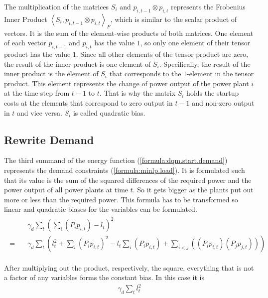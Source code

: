 The multiplication of the matrices $S_i$ and $p_{i, t-1} \otimes p_{i, t}$ represents the Frobenius Inner Product $\left\langle S_i, p_{i, t-1} \otimes p_{i, t} \right\rangle_F$, which is similar to the scalar product of vectors.
It is the sum of the element-wise products of both matrices.
One element of each vector $p_{i, t-1}$ and $p_{i, t}$ has the value $1$, so only one element of their tensor product has the value $1$.
Since all other elements of the tensor product are zero, the result of the inner product is one element of $S_i$.
Specifically, the result of the inner product is the element of $S_i$ that corresponds to the $1$-element in the tensor product.
This element represents the change of power output of the power plant $i$ at the time step from $t-1$ to $t$.
That is why the matrix $S_i$ holds the startup costs at the elements that correspond to zero output in $t-1$ and non-zero output in $t$ and vice versa.
$S_i$ is called quadratic bias.

\subsection{Rewrite Demand}

The third summand of the energy function (\ref{formula:dqm.start.demand}) represents the demand constraints (\ref{formula:minlp.load}).
It is formulated such that its value is the sum of the squared differences of the required power and the power output of all power plants at time $t$.
So it gets bigger as the plants put out more or less than the required power.
This formula has to be transformed so linear and quadratic biases for the variables can be formulated.
\begin{align}
\begin{split}
  & \gamma_d \sum_t \left( \sum_i \left( P_i p_{i, t} \right) - l_t \right)^2 \\
  = \quad & \gamma_d \sum_t \left(
    l_t^2
    + \sum_i \left( P_i p_{i, t} \right)^2
    - l_t \sum_i \left( P_i p_{i, t} \right)
    + \sum_{i < j} \left( \left( P_i p_{i, t} \right) \left( P_j p_{j, t} \right) \right) \right)
    \label{formula:dqm.demand.multiplied_out}
\end{split}
\end{align}

After multiplying out the product, respectively, the square, everything that is not a factor of any variables forms the constant bias.
In this case it is
\begin{align}
  \gamma_d \sum_t l_t^2
\end{align}

